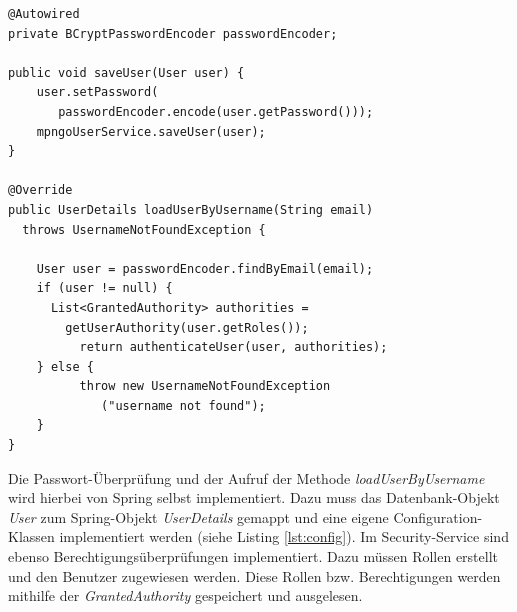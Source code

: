 \lstset{
  caption={Speichern und Auslesen des Users.}, 
  basicstyle=\small\ttfamily, 
  label=lst:phase, 
  language=Java,
  frame=single,
  breaklines=true, %
  postbreak=\mbox{\textcolor{red}{$\hookrightarrow$}\space},
}

\begin{samepage}%
	\begin{lstlisting}[float=tbhp]
@Autowired
private BCryptPasswordEncoder passwordEncoder;

public void saveUser(User user) {
    user.setPassword(
       passwordEncoder.encode(user.getPassword()));
    mpngoUserService.saveUser(user);
}

@Override
public UserDetails loadUserByUsername(String email) 
  throws UsernameNotFoundException {

    User user = passwordEncoder.findByEmail(email);
    if (user != null) {
      List<GrantedAuthority> authorities =     
        getUserAuthority(user.getRoles());
          return authenticateUser(user, authorities);
    } else {
          throw new UsernameNotFoundException
             ("username not found");
    }
}
	\end{lstlisting}
\end{samepage}
Die Passwort-Überprüfung und der Aufruf der Methode \textit{loadUserByUsername} wird hierbei von Spring selbst implementiert.  Dazu muss das Datenbank-Objekt \textit{User} zum Spring-Objekt \textit{UserDetails} gemappt und eine eigene Configuration-Klassen implementiert werden (siehe Listing \ref{lst:config}). Im Security-Service sind ebenso Berechtigungsüberprüfungen implementiert. Dazu müssen Rollen erstellt und den Benutzer zugewiesen werden. Diese Rollen bzw. Berechtigungen werden mithilfe der \textit{GrantedAuthority} gespeichert und ausgelesen.

\lstset{
  caption={Konfiguration für das Spring Security UserService. Das Service \textit{UserSecurityService} wird nun als das zentrale Service für die Useroperationen von Spring Security verwendet.}, 
  basicstyle=\small\ttfamily, 
  label=lst:config, 
  language=Java,
  frame=single,
  breaklines=true, %
  postbreak=\mbox{\textcolor{red}{$\hookrightarrow$}\space},
}

